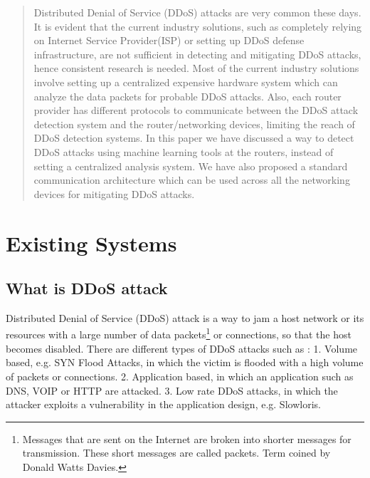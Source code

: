 \documentclass[12pt,oneside,a4paper]{article}
\begin{document}

\doublespacing
\renewcommand{\thepage}{\roman{page}}%
\setcounter{page}{2}%
\tableofcontents
\newpage
\pagestyle{myheadings}
\renewcommand{\thepage}{\arabic{page}}%

\begin{abstract}
Distributed Denial of Service (DDoS) attacks are very common these days\cite{ddos-attack-news}. It is evident that the current industry solutions, such as completely relying on Internet Service Provider(ISP) or setting up DDoS defense infrastructure, are not sufficient in detecting and mitigating DDoS attacks, hence consistent research is needed. Most of the current industry solutions involve setting up a centralized expensive hardware system which can analyze the data packets for probable DDoS attacks. Also, each router provider has different protocols to communicate between the DDoS attack detection system and the router/networking devices, limiting the reach of DDoS detection systems. In this paper we have discussed a way to detect DDoS attacks using machine learning tools at the routers, instead of setting a centralized analysis system. We have also proposed a standard communication architecture which can be used across all the networking devices for mitigating DDoS attacks.
\end{abstract}

\section{Existing Systems}

\subsection{What is DDoS attack}
Distributed Denial of Service (DDoS) attack is a way to jam a host network or its resources with a large number of data packets\footnote{Messages that are sent on the Internet are broken into shorter messages for transmission. These short messages are called packets. Term coined by Donald Watts Davies.} \cite{network-data-packet} or connections, so that the host becomes disabled. There are different types of DDoS attacks such as :
1. Volume based, e.g. SYN Flood Attacks, in which the victim is flooded with a high volume of packets or connections.
2. Application based, in which an application such as DNS, VOIP or HTTP are attacked.
3. Low rate DDoS attacks, in which the attacker exploits a vulnerability in the application design, e.g. Slowloris.
\cite{DDoS-attacks}
\end{document}
